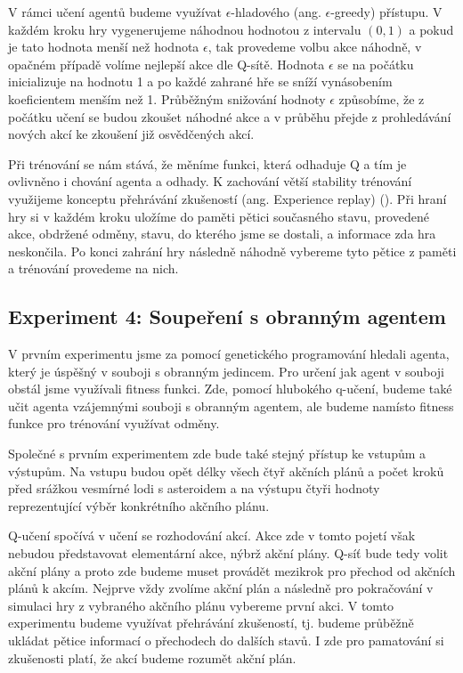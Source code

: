 V rámci učení agentů budeme využívat $\epsilon$-hladového (ang. $\epsilon$-greedy) přístupu.
V každém kroku hry vygenerujeme náhodnou hodnotou z intervalu $(0,1)$ a pokud je tato hodnota menší než hodnota $\epsilon$, tak provedeme volbu akce náhodně, v opačném případě volíme nejlepší akce dle Q-sítě.
Hodnota $\epsilon$ se na počátku inicializuje na hodnotu 1 a po každé zahrané hře se sníží vynásobením koeficientem menším než 1. 
Průběžným snižování hodnoty $\epsilon$ způsobíme, že z počátku učení se budou zkoušet náhodné akce a v průběhu přejde z prohledávání nových akcí ke zkoušení již osvědčených akcí.


\par
Při trénování se nám stává, že měníme funkci, která odhaduje Q a tím je ovlivněno i chování agenta a odhady. K zachování větší stability trénování využijeme konceptu přehrávání zkušeností (ang. Experience replay) (\cite{experienceReplay}).
Při hraní hry si v každém kroku uložíme do paměti pětici současného stavu, provedené akce, obdržené odměny, stavu, do kterého jsme se dostali, a informace zda hra neskončila.
Po konci zahrání hry následně náhodně vybereme tyto pětice z paměti a trénování provedeme na nich.



\subsection{Experiment 4: Soupeření s obranným agentem}
V prvním experimentu jsme za pomocí genetického programování hledali agenta, který je úspěšný v souboji s obranným jedincem. Pro určení jak agent v souboji obstál jsme využívali fitness funkci.
Zde, pomocí hlubokého q-učení, budeme také učit agenta vzájemnými souboji s obranným agentem, ale budeme namísto fitness funkce pro trénování využívat odměny.

Společné s prvním experimentem zde bude také stejný přístup ke vstupům a výstupům. 
Na vstupu budou opět délky všech čtyř akčních plánů a počet kroků před srážkou vesmírné lodi s asteroidem a na výstupu čtyři hodnoty reprezentující výběr konkrétního akčního plánu.

Q-učení spočívá v učení se rozhodování akcí. Akce zde v tomto pojetí však nebudou představovat elementární akce, nýbrž akční plány. 
Q-síť bude tedy volit akční plány a proto zde budeme muset provádět mezikrok pro přechod od akčních plánů k akcím.
Nejprve vždy zvolíme akční plán a následně pro pokračování v simulaci hry z vybraného akčního plánu vybereme první akci.
V tomto experimentu budeme využívat přehrávání zkušeností, tj. budeme průběžně ukládat pětice informací o přechodech do dalších stavů. 
I zde pro pamatování si zkušenosti platí, že akcí budeme rozumět akční plán.


